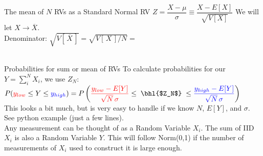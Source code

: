 \documentclass[10pt,sans,english,compress,xcolor=dvipsnames]{beamer}
\newcommand{\bhlm}[1]{\bhl{$#1$}}
\begin{document}
\begin{frame}{The mean of $N$ RVs as a Standard Normal RV}
\footnotesize
$Z =  \dfrac{X-\mu}{\sigma} \equiv  \dfrac{X-E[X] }{\sqrt{V[X]}}$\;\; We will let $X\rightarrow \overline{X}$. \\[1ex]

Denominator: $\sqrt{V[\,\overline{X}\,]} = \sqrt{V[\,X\,] / N } =$ \\[1ex]

\\[1ex]

\end{frame}


\begin{frame}{Probabilities for sum or mean of RVs\; \small{ } }
\footnotesize
To calculate probabilities for our $Y=\sum\limits_i^N X_i$, we use $Z_N$:\\[1ex]

$P(\rbl{y_{low}} \leq Y \leq \bbl{y_{high}} ) = 
P\left( 
\rbl{ \dfrac{ y_{low} -  E[Y] }{ \sqrt{N}\, \sigma} }  
\leq\; 
\bhlm{Z_N}
\; \leq  
\bbl{\dfrac{ y_{high} -  E[Y] }{ \sqrt{N}\, \sigma} }
\right)$\\[3ex]

This looks a bit much, but is very easy to handle if we know $N$, $E[Y]$, and $\sigma$. See python example (just a few lines). \\[1ex]

Any measurement can be thought of as a Random Variable $X_i$.  The sum of IID\magt{*} $X_i$ is also a Random Variable $Y$. This will follow Norm(0,1) if the number of measurements of $X_i$ used to construct it is large enough.\\




\end{frame}
\end{document}
